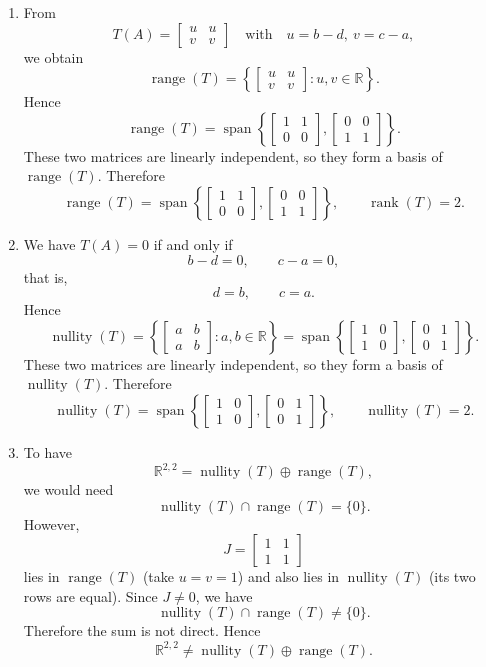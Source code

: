 \documentclass[12pt]{article}
\newcommand{\R}{\mathbb{R}}
\DeclareMathOperator{\Range}{range}
\DeclareMathOperator{\Rank}{rank}
\DeclareMathOperator{\Nullity}{nullity}
\DeclareMathOperator{\Null}{nullity}
\begin{document}
\begin{enumerate}[label=(\alph*)]
\item From
\[
T(A)=
\begin{bmatrix}
u&u\\
v&v
\end{bmatrix}
\quad\text{with}\quad
u=b-d,\ v=c-a,
\]
we obtain
\[
\Range(T)=
\left\{
\begin{bmatrix}
u&u\\
v&v
\end{bmatrix}:u,v\in\R
\right\}.
\]
Hence
\[
\Range(T)
=
\operatorname{span}\left\{
\begin{bmatrix}1&1\\0&0\end{bmatrix},
\begin{bmatrix}0&0\\1&1\end{bmatrix}
\right\}.
\]
These two matrices are linearly independent, so they form a basis of \(\Range(T)\). Therefore
\[
\boxed{
\Range(T)=
\operatorname{span}\left\{
\begin{bmatrix}1&1\\0&0\end{bmatrix},
\begin{bmatrix}0&0\\1&1\end{bmatrix}
\right\},
\qquad
\Rank(T)=2.}
\]

\item We have \(T(A)=0\) if and only if
\[
b-d=0,\qquad c-a=0,
\]
that is,
\[
d=b,\qquad c=a.
\]
Hence
\[
\Null(T)=
\left\{
\begin{bmatrix}a&b\\a&b\end{bmatrix}:a,b\in\R
\right\}
=
\operatorname{span}\left\{
\begin{bmatrix}1&0\\1&0\end{bmatrix},
\begin{bmatrix}0&1\\0&1\end{bmatrix}
\right\}.
\]
These two matrices are linearly independent, so they form a basis of \(\Null(T)\). Therefore
\[
\boxed{
\Null(T)=
\operatorname{span}\left\{
\begin{bmatrix}1&0\\1&0\end{bmatrix},
\begin{bmatrix}0&1\\0&1\end{bmatrix}
\right\},
\qquad
\Nullity(T)=2.}
\]

\item To have
\[
\R^{2,2}=\Null(T)\oplus \Range(T),
\]
we would need
\[
\Null(T)\cap \Range(T)=\{0\}.
\]
However,
\[
J=\begin{bmatrix}1&1\\1&1\end{bmatrix}
\]
lies in \(\Range(T)\) (take \(u=v=1\)) and also lies in \(\Null(T)\) (its two rows are equal). Since \(J\neq 0\), we have
\[
\Null(T)\cap \Range(T)\neq \{0\}.
\]
Therefore the sum is not direct. Hence
\[
\boxed{\R^{2,2}\neq \Null(T)\oplus \Range(T).}
\]
\end{enumerate}
\end{document}
